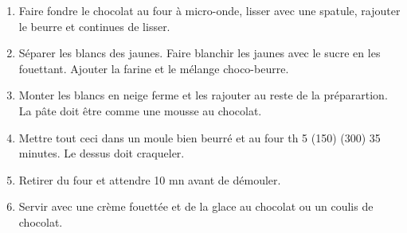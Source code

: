 
\begin{ingredients}
\end{ingredients}


\begin{recipe}
  \begin{enumerate}

  \item Faire fondre le chocolat au four à micro-onde, lisser avec une
    spatule, rajouter le beurre et continues de lisser.

  \item S\'eparer les blancs des jaunes. Faire blanchir les jaunes avec le sucre
    en les fouettant.  Ajouter la farine et le m\'elange choco-beurre.

  \item Monter les blancs en neige ferme et les rajouter au reste de
    la pr\'eparartion.  La p\^ate doit \^etre comme une mousse au chocolat.

  \item Mettre tout ceci dans un moule bien beurr\'e et
    au four th 5 (150\degreeC) (300\F) 35 minutes.  Le dessus doit craqueler.

  \item Retirer du four et attendre 10 mn avant de d\'emouler.

  \item Servir avec une cr\`eme fouett\'ee et de la glace au
    chocolat ou un coulis de chocolat.

  \end{enumerate}
\end{recipe}
